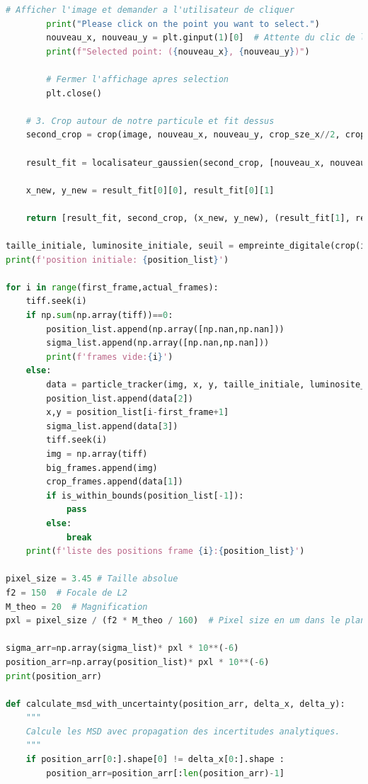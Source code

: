 \documentclass[11pt,letterpaper]{article}
\begin{document}
\begin{lstlisting}[language=python]
        # Afficher l'image et demander a l'utilisateur de cliquer
        print("Please click on the point you want to select.")
        nouveau_x, nouveau_y = plt.ginput(1)[0]  # Attente du clic de l'utilisateur (1 point)
        print(f"Selected point: ({nouveau_x}, {nouveau_y})")
        
        # Fermer l'affichage apres selection
        plt.close()
    
    # 3. Crop autour de notre particule et fit dessus
    second_crop = crop(image, nouveau_x, nouveau_y, crop_sze_x//2, crop_sze_y//2)    # Re-crop autour d'une seule particule

    result_fit = localisateur_gaussien(second_crop, [nouveau_x, nouveau_y])

    x_new, y_new = result_fit[0][0], result_fit[0][1]

    return [result_fit, second_crop, (x_new, y_new), (result_fit[1], result_fit[2])]

taille_initiale, luminosite_initiale, seuil = empreinte_digitale(crop(img,x,y,crop_sze_x*0.8,crop_sze_y*0.5))
print(f'position initiale: {position_list}')

for i in range(first_frame,actual_frames):
    tiff.seek(i)
    if np.sum(np.array(tiff))==0:
        position_list.append(np.array([np.nan,np.nan]))
        sigma_list.append(np.array([np.nan,np.nan]))
        print(f'frames vide:{i}')
    else:
        data = particle_tracker(img, x, y, taille_initiale, luminosite_initiale, seuil)
        position_list.append(data[2])
        x,y = position_list[i-first_frame+1]
        sigma_list.append(data[3])
        tiff.seek(i)
        img = np.array(tiff)
        big_frames.append(img)
        crop_frames.append(data[1])
        if is_within_bounds(position_list[-1]):
            pass
        else:
            break
    print(f'liste des positions frame {i}:{position_list}')

pixel_size = 3.45 # Taille absolue
f2 = 150  # Focale de L2
M_theo = 20  # Magnification
pxl = pixel_size / (f2 * M_theo / 160)  # Pixel size en um dans le plan de la particule

sigma_arr=np.array(sigma_list)* pxl * 10**(-6)
position_arr=np.array(position_list)* pxl * 10**(-6)
print(position_arr)

def calculate_msd_with_uncertainty(position_arr, delta_x, delta_y):
    """
    Calcule les MSD avec propagation des incertitudes analytiques.
    """
    if position_arr[0:].shape[0] != delta_x[0:].shape :
        position_arr=position_arr[:len(position_arr)-1]


\end{lstlisting}
\end{document}
